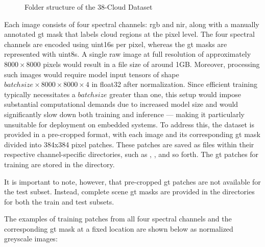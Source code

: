 {\begin{figure}[H]
\caption{Folder structure of the 38-Cloud Dataset}
\label{fig:dsFolderStruct}
\end{figure}

Each image consists of four spectral channels: \gls{rgb} and \gls{nir}, along with a manually annotated \gls{gt} mask that labels cloud regions at the pixel level.
The four spectral channels are encoded using \glspl{uint16} per pixel, whereas the \gls{gt} masks are represented with \glspl{uint8}.
A single raw image at full resolution of approximately \ensuremath{8000\times8000} pixels would result in a file size of around 1GB.
Moreover, processing such images would require model input tensors of shape \ensuremath{batchsize\times8000\times8000\times4} in \gls{float32} after normalization.
Since efficient training typically necessitates a \ensuremath{batchsize} greater than one,
this setup would impose substantial computational demands due to increased model size and would significantly slow down both training and inference ---
making it particularly unsuitable for deployment on embedded systems.
To address this, the dataset is provided in a pre-cropped format, with each image and its corresponding \gls{gt} mask divided into 384x384 pixel patches.
These patches are saved as  files within their respective channel-specific directories, such as , , and so forth.
The \gls{gt} patches for training are stored in the  directory.


It is important to note, however, that pre-cropped \gls{gt} patches are not available for the test subset.
Instead, complete scene \gls{gt} masks are provided in the  directories for both the train and test subsets.

The examples of training patches from all four spectral channels and the corresponding \gls{gt} mask at a fixed location are shown below as normalized greyscale images: 

}
